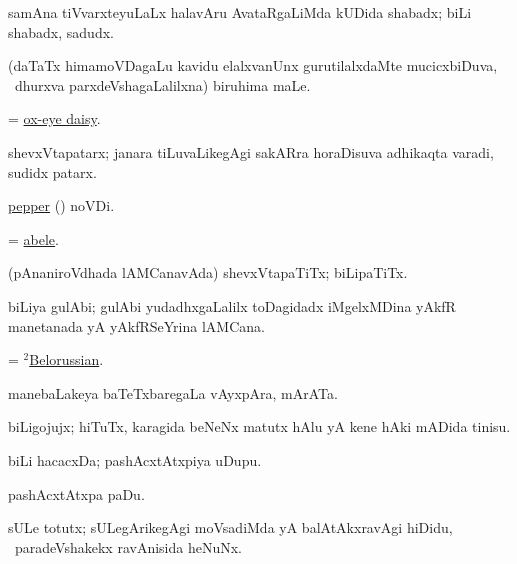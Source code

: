 \bentry
{}
\gl{\nA}
\bmng
samAna tiVvarxteyuLaLx halavAru AvataRgaLiMda kUDida shabadx; biLi shabadx, sadudx. 
\emng
\eentry

\bentry
{}
\gl{\nA}
\bmng
(daTaTx himamoVDagaLu kavidu elalxvanUnx gurutilalxdaMte mucicxbiDuva, \kanmu\ dhurxva parxdeVshagaLalilxna) biruhima maLe. 
\emng
\eentry

\bentry
{}
\gl{\nA}
\bmng
= \hyperref{kandict_o.pdf}{O}{ox-eye daisy}{ox-eye daisy}. 
\emng
\eentry

\bentry
{}
\gl{\nA}
\bmng
shevxVtapatarx; janara tiLuvaLikegAgi sakARra horaDisuva adhikaqta varadi, sudidx patarx. 
\emng
\eentry

\bentry
{}
\gl{\nA}
\bmng
\hyperref{kandict_p.pdf}{P}{pepper(1) pagu(6)}{pepper} (\pagu {}) noVDi. 
\emng
\eentry

\bentry
{}
\gl{\nA}
\bmng
= \hyperref{kandict_a.pdf}{A}{abele}{abele}. 
\emng
\eentry

\bentry
{}
\gl{\nA}
\bmng
(pAnaniroVdhada lAMCanavAda) shevxVtapaTiTx; biLipaTiTx. 
\emng
\eentry

\bentry
{}
\gl{\nA}
\bmng
biLiya gulAbi; gulAbi yudadhxgaLalilx toDagidadx iMgelxMDina yAkfR manetanada yA yAkfRSeYrina lAMCana. 
\emng
\eentry

\bentry
{}
\gl{\nA}
\bmng
= \hyperref{kandict_b.pdf}{B}{Belorussian(2)}{$^2$Belorussian}. 
\emng
\eentry

\bentry
{}
\gl{\nA}
\bmng
manebaLakeya baTeTxbaregaLa vAyxpAra, mArATa. 
\emng
\eentry

\bentry
{}
\gl{\nA}
\bmng
biLigojujx; hiTuTx, karagida beNeNx matutx hAlu yA kene hAki mADida tinisu. 
\emng
\eentry

\bentry
{}
\gl{\nA}
\bmng
biLi hacacxDa; pashAcxtAtxpiya uDupu. 
\emng

\noindent
\gl{\pagu}
\bmng
{} pashAcxtAtxpa paDu. 
\emng
\eentry

\bentry
{}
\gl{\nA}
\bmng
sULe totutx; sULegArikegAgi moVsadiMda yA balAtAkxravAgi hiDidu, \sA\ paradeVshakekx ravAnisida heNuNx. 
\emng
\eentry

